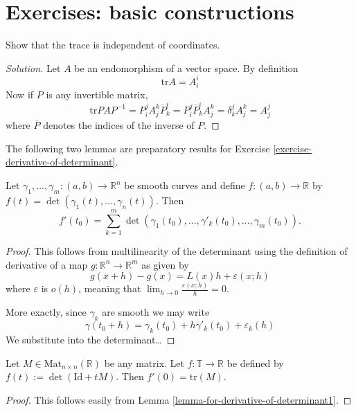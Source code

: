 \section{Exercises: basic constructions}
\label{section-exercises-constructions}

\begin{exercise}
\label{exercise-trace-is-independent-of-coordinates}
Show that the trace is independent of coordinates.
\end{exercise}

\begin{proof}[Solution]
Let $A$ be an endomorphism of a vector space. By definition
$$
\text{tr}A=A_i^i
$$
Now if $P$ is any invertible matrix,
$$
\text{tr}PAP^{-1}=P^j_iA_j^k\overline{P}_k^i=P^j_i\overline{P}_k^iA_j^k
=\delta_k^jA_j^k=A_j^j
$$
where $\overline{P}$ denotes the indices of the inverse of $P$.
\end{proof}

The following two lemmas are preparatory results for Exercise
\ref{exercise-derivative-of-determinant}.

\begin{lemma}
\label{lemma-for-derivative-of-determinant1}
Let $\gamma_1,...,\gamma_m:(a,b)\to\mathbb{R}^n$ be smooth curves and define 
$f:(a,b)\to\mathbb{R}$ by $f(t)=\det(\gamma_1(t),\ldots,\gamma_n(t))$. Then
$$
f'(t_0)
=\sum_{k=1}^{m}\det(\gamma_1(t_0),\ldots,\gamma'_k(t_0),\ldots,\gamma_m(t_0)).
$$
\end{lemma}

\begin{proof}
This follows from multilinearity of the determinant using the definition of
derivative of a map $g:\mathbb{R}^n \to \mathbb{R}^m$ as given by
$$
g(x+h)-g(x)=L(x)h+\varepsilon(x;h)
$$
where $\varepsilon$ is $o(h)$, meaning that  $\lim_{h \to 0}
\frac{\varepsilon(x;h)}{h}=0$.

More exactly, since $\gamma_k$ are smooth we may write
$$
\gamma(t_0+h)=\gamma_k(t_0)+h\gamma'_k(t_0)+\varepsilon_k(h)
$$
We substitute into the determinant…
\end{proof}

\begin{lemma}
\label{lemma-for-derivative-of-determinant2}
Let $M \in \text{Mat}_{n\times n}(\mathbb{R})$ be any matrix. Let 
$f:\mathbb{T}\to \mathbb{R}$ be defined by $f(t):=\det(\text{Id}+tM)$. Then 
$f'(0)=\text{tr}(M)$.
\end{lemma}

\begin{proof}
This follows easily from Lemma \ref{lemma-for-derivative-of-determinant1}.
\end{proof}

